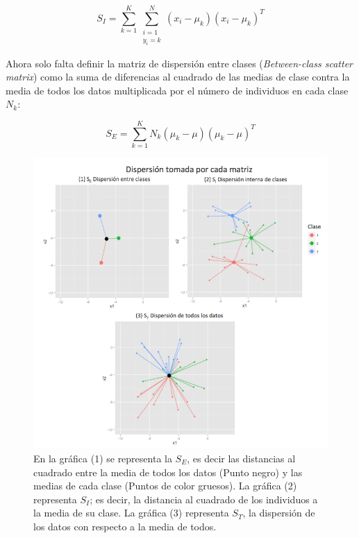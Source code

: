 \begin{equation}\label{eq:2.3}
S_I = \sum_{k=1}^{K} 
					\sum_{\substack{i = 1\\
                  			   	y_i = k}}
                    ^{N}
 ({x_i-\mu_{k}})({x_i-\mu_{k}})^T 	
\end{equation}

Ahora solo falta definir la matriz de dispersión entre clases (\textit{Between-class scatter matrix}) como la suma de diferencias al cuadrado de las medias de clase contra la media de todos los datos multiplicada por el número de individuos en cada clase $N_k$:

\begin{equation} \label{eq:2.4}
S_E = \sum_{k = 1}^K N_k (\mu_k - \mu)(\mu_k - \mu)^T	
\end{equation}

\begin{figure}[!ht] \label{Fig1.1}
  \centering
	\includegraphics[width=1\textwidth]{Figures/Chapter2_SE_SI}	
  \caption[Distancias en las matrices de dispersión.]
  {En la gráfica (1) se representa la $S_E$, es decir las distancias al cuadrado entre la media de todos los datos (Punto negro) y las medias de cada clase (Puntos de color gruesos). La gráfica (2) representa $S_I$; es decir, la distancia al cuadrado de los individuos a la media de su clase. La gráfica (3) representa $S_T$, la dispersión de los datos con respecto a la media de todos.}
\end{figure}

